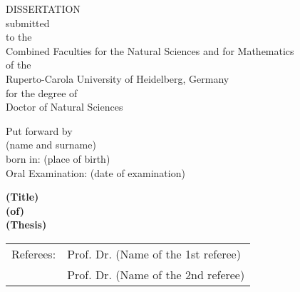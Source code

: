 
\thispagestyle{empty}
\begin{center}
  \renewcommand{\baselinestretch}{2.00}
  \Large
  DISSERTATION\\
  \large submitted\\
  to the\\
  Combined Faculties for the Natural Sciences and for Mathematics\\
  of the\\
  Ruperto-Carola University of Heidelberg, Germany\\
  for the degree of\\
  Doctor of Natural Sciences
  \par\vfill\normalfont
  Put forward by\\
	(name and surname)\\
	born in: (place of birth)\\
	Oral Examination: (date of examination)
\end{center}
\cleardoublepage
\newpage

\thispagestyle{empty}
\begin{center}
  \renewcommand{\baselinestretch}{2.00}
  \huge\bfseries
    (Title)\\
    (of)\\
    (Thesis)
  \par
  \vfill
  \Large\normalfont
	\begin{tabular}{rl}
		Referees: & Prof. Dr. (Name of the 1st referee) \\
							& Prof. Dr. (Name of the 2nd referee)
	\end{tabular}
\end{center}\par

\renewcommand{\baselinestretch}{1.00}\normalsize

